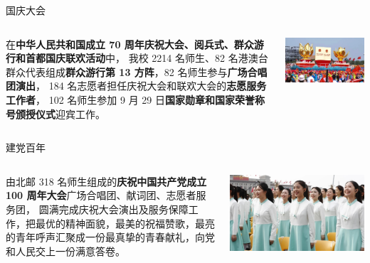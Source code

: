 \documentclass[aspectratio=169, utf8]{beamer}
\begin{document}
\begin{frame}{国庆大会}
    \begin{columns}
        \setlength{\parindent}{2em}

        在\textcolor{Fore}{\textbf{中华人民共和国成立 70 周年庆祝大会、阅兵式、群众游行和首都国庆联欢活动}}中，
        我校 2214 名师生、82 名港澳台群众代表组成\textcolor{Fore}{\textbf{群众游行第 13 方阵}}，82 名师生参与\textcolor{Fore}{\textbf{广场合唱团演出}}，
        184 名志愿者担任庆祝大会和联欢大会的\textcolor{Fore}{\textbf{志愿服务工作者}}，
        102 名师生参加 9 月 29 日\textcolor{Fore}{\textbf{国家勋章和国家荣誉称号颁授仪式}}迎宾工作。

        \includegraphics[width=\textwidth]{./resources/27.png}
    \end{columns}
\end{frame}

\begin{frame}{建党百年}
    \begin{columns}
        \setlength{\parindent}{2em}

        由北邮 318 名师生组成的\textcolor{Fore}{\textbf{庆祝中国共产党成立 100 周年大会}}广场合唱团、献词团、志愿者服务团，
        圆满完成庆祝大会演出及服务保障工作，把最优的精神面貌，最美的祝福赞歌，最亮的青年呼声汇聚成一份最真挚的青春献礼，向党和人民交上一份满意答卷。

        \includegraphics[width=\textwidth]{./resources/28.jpg}
    \end{columns}
\end{frame}
\end{document}
